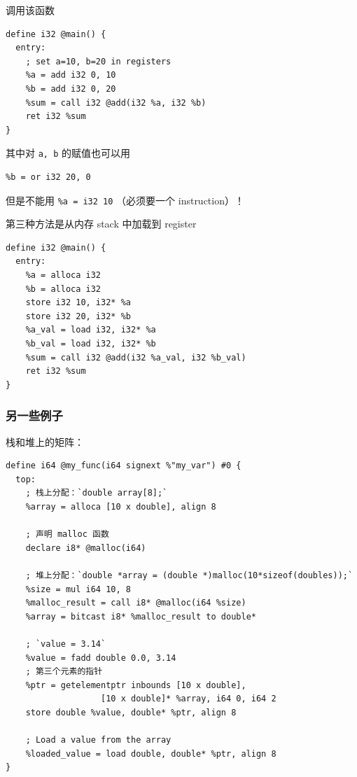 调用该函数
\begin{lstlisting}[language=none]
define i32 @main() {
  entry:
    ; set a=10, b=20 in registers
    %a = add i32 0, 10
    %b = add i32 0, 20
    %sum = call i32 @add(i32 %a, i32 %b)
    ret i32 %sum
}
\end{lstlisting}

其中对 \verb`a, b` 的赋值也可以用
\begin{lstlisting}[language=none]
%a = or i32 10, 0
%b = or i32 20, 0
\end{lstlisting}
但是不能用 \verb`%a = i32 10` （必须要一个 instruction）！

第三种方法是从内存 stack 中加载到 register
\begin{lstlisting}[language=none]
define i32 @main() {
  entry:
    %a = alloca i32
    %b = alloca i32
    store i32 10, i32* %a
    store i32 20, i32* %b
    %a_val = load i32, i32* %a
    %b_val = load i32, i32* %b
    %sum = call i32 @add(i32 %a_val, i32 %b_val)
    ret i32 %sum
}
\end{lstlisting}

\subsubsection{另一些例子}
栈和堆上的矩阵：
\begin{lstlisting}[language=none]
define i64 @my_func(i64 signext %"my_var") #0 {
  top:
    ; 栈上分配：`double array[8];`
    %array = alloca [10 x double], align 8

    ; 声明 malloc 函数
    declare i8* @malloc(i64)

    ; 堆上分配：`double *array = (double *)malloc(10*sizeof(doubles));`
    %size = mul i64 10, 8
    %malloc_result = call i8* @malloc(i64 %size)
    %array = bitcast i8* %malloc_result to double*

    ; `value = 3.14`
    %value = fadd double 0.0, 3.14
    ; 第三个元素的指针
    %ptr = getelementptr inbounds [10 x double], 
                   [10 x double]* %array, i64 0, i64 2
    store double %value, double* %ptr, align 8

    ; Load a value from the array
    %loaded_value = load double, double* %ptr, align 8
}
\end{lstlisting}

